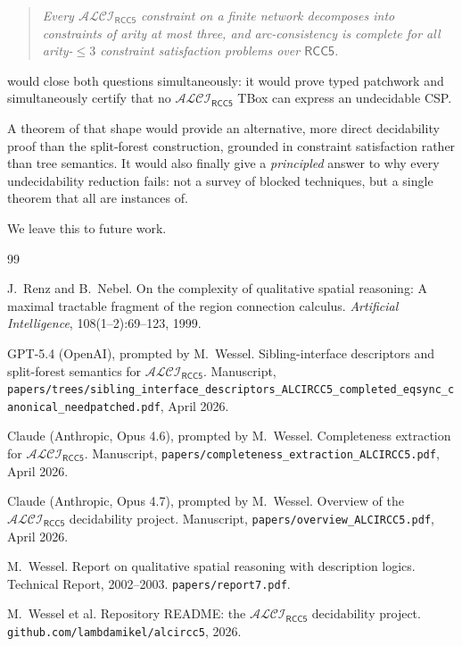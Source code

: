 \documentclass[11pt]{article}
\theoremstyle{definition}
\theoremstyle{remark}
\newcommand{\ALCIRCC}[1]{\mathcal{ALCI}_{\mathsf{RCC#1}}}
\begin{document}
\begin{quote}\emph{
  Every $\mathcal{ALCI}_{\mathsf{RCC5}}$ constraint on a finite
  network decomposes into constraints of arity at most three, and
  arc-consistency is complete for all arity-$\leq 3$ constraint
  satisfaction problems over $\mathsf{RCC5}$.
}\end{quote}

\noindent would close both questions simultaneously: it would
prove typed patchwork and simultaneously certify that no
$\ALCIRCC{5}$ TBox can express an undecidable CSP.

A theorem of that shape would provide an alternative, more direct
decidability proof than the split-forest construction, grounded in
constraint satisfaction rather than tree semantics.  It would also
finally give a \emph{principled} answer to why every undecidability
reduction fails: not a survey of blocked techniques, but a single
theorem that all are instances of.

We leave this to future work.

\begin{thebibliography}{99}

J.~Renz and B.~Nebel.
\newblock On the complexity of qualitative spatial reasoning: A maximal
  tractable fragment of the region connection calculus.
\newblock \emph{Artificial Intelligence}, 108(1--2):69--123, 1999.

GPT-5.4 (OpenAI), prompted by M.~Wessel.
\newblock Sibling-interface descriptors and split-forest semantics for
  $\ALCIRCC{5}$.
\newblock Manuscript,
  \texttt{papers/trees/sibling\_interface\_descriptors\_ALCIRCC5\_completed\_eqsync\_canonical\_needpatched.pdf},
  April 2026.

Claude (Anthropic, Opus 4.6), prompted by M.~Wessel.
\newblock Completeness extraction for $\ALCIRCC{5}$.
\newblock Manuscript,
  \texttt{papers/completeness\_extraction\_ALCIRCC5.pdf}, April 2026.

Claude (Anthropic, Opus 4.7), prompted by M.~Wessel.
\newblock Overview of the $\ALCIRCC{5}$ decidability project.
\newblock Manuscript, \texttt{papers/overview\_ALCIRCC5.pdf}, April 2026.

M.~Wessel.
\newblock Report on qualitative spatial reasoning with description logics.
\newblock Technical Report, 2002--2003.
\newblock \texttt{papers/report7.pdf}.

M.~Wessel et al.
\newblock Repository README: the $\ALCIRCC{5}$ decidability project.
\newblock \texttt{github.com/lambdamikel/alcircc5}, 2026.

\end{thebibliography}
\end{document}
